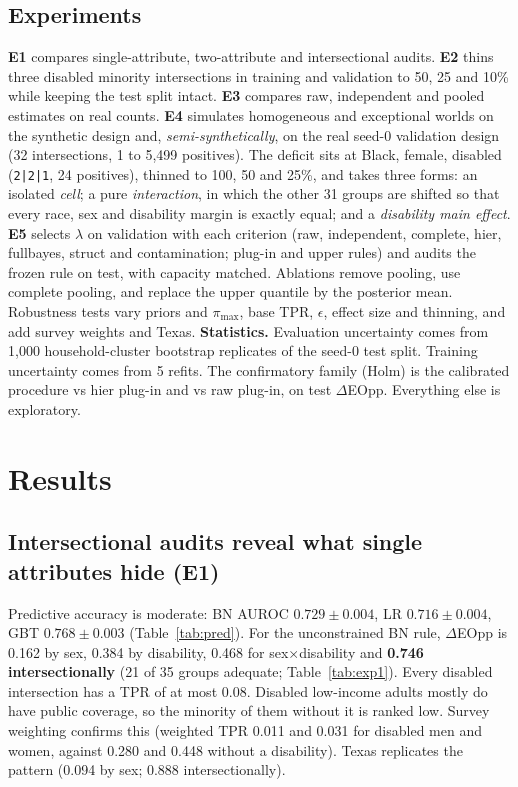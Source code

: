 \documentclass[11pt]{article}
\begin{document}
\subsection{Experiments}
\textbf{E1} compares single-attribute, two-attribute and intersectional audits.
\textbf{E2} thins three disabled minority intersections in training and validation to 50, 25 and 10\% while keeping the
test split intact.
\textbf{E3} compares raw, independent and pooled estimates on real counts.
\textbf{E4} simulates homogeneous and exceptional worlds on the synthetic design and, \emph{semi-synthetically}, on the real
seed-0 validation design (32 intersections, 1 to 5,499 positives). The deficit sits at Black, female, disabled
(\texttt{2|2|1}, 24 positives), thinned to 100, 50 and 25\%, and takes three forms: an isolated \emph{cell}; a pure
\emph{interaction}, in which the other 31 groups are shifted so that every race, sex and disability margin is exactly
equal; and a \emph{disability main effect}.
\textbf{E5} selects $\lambda$ on validation with each criterion (raw, independent, complete, hier, fullbayes, struct and
contamination; plug-in and upper rules) and audits the frozen rule on test, with capacity matched.
Ablations remove pooling, use complete pooling, and replace the upper quantile by the posterior mean. Robustness tests vary
priors and $\pi_{\max}$, base TPR, $\epsilon$, effect size and thinning, and add survey weights and Texas.
\textbf{Statistics.} Evaluation uncertainty comes from 1,000 household-cluster bootstrap replicates of the seed-0 test
split. Training uncertainty comes from 5 refits. The confirmatory family (Holm) is the calibrated procedure vs hier
plug-in and vs raw plug-in, on test $\Delta$EOpp. Everything else is exploratory.

\section{Results}
\subsection{Intersectional audits reveal what single attributes hide (E1)}
Predictive accuracy is moderate: BN AUROC $0.729\pm0.004$, LR $0.716\pm0.004$, GBT $0.768\pm0.003$
(Table~\ref{tab:pred}). For the unconstrained BN rule, $\Delta$EOpp is 0.162 by sex, 0.384 by disability, 0.468 for
sex$\times$disability and \textbf{0.746 intersectionally} (21 of 35 groups adequate; Table~\ref{tab:exp1}). Every disabled
intersection has a TPR of at most 0.08. Disabled low-income adults mostly do have public coverage, so the minority of them
without it is ranked low. Survey weighting confirms this (weighted TPR 0.011 and 0.031 for disabled men and women, against
0.280 and 0.448 without a disability). Texas replicates the pattern (0.094 by sex; 0.888 intersectionally).
\end{document}
